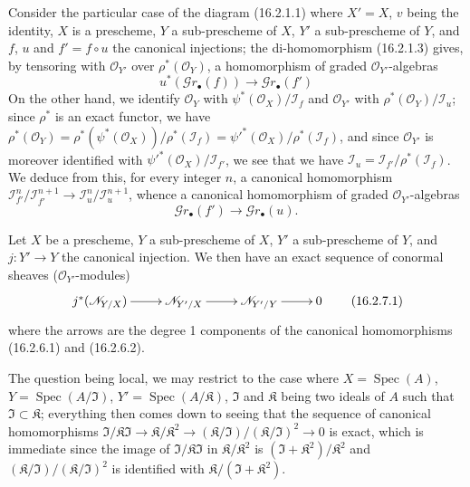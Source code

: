 \begin{env}[16.2.6]
\label{IV.16.2.6}
Consider the particular case of the diagram (16.2.1.1) where $X'=X$, $v$ being
the identity, $X$ is a prescheme, $Y$ a sub-prescheme of $X$, $Y'$ a
sub-prescheme of $Y$, and $f$, $u$ and $f'=f\circ u$ the canonical injections; the
di-homomorphism (16.2.1.3) gives, by tensoring with
$\mathcal{O}_{Y'}$ over $\rho^*(\mathcal{O}_Y)$, a homomorphism of
graded $\mathcal{O}_{Y'}$-algebras
\[
  u^*(\mathscr{G}r_\bullet(f))
  \longrightarrow\mathscr{G}r_\bullet(f')
  \tag{16.2.6.1}
  \label{IV.16.2.6.1}
\]
On the other hand, we identify $\mathcal{O}_Y$ with
$\psi^*(\mathcal{O}_X)/\mathscr{I}_f$ and $\mathcal{O}_{Y'}$ with
$\rho^*(\mathcal{O}_Y)/\mathscr{I}_u$; since $\rho^*$ is an exact functor,
we have
$\rho^*(\mathcal{O}_Y)=
\rho^*(\psi^*(\mathcal{O}_X))/\rho^*(\mathscr{I}_f)=
\psi'^*(\mathcal{O}_X)/\rho^*(\mathscr{I}_f)$, and since
$\mathcal{O}_{Y'}$ is moreover identified with
$\psi'^*(\mathcal{O}_X)/\mathscr{I}_{f'}$, we see that we have
$\mathscr{I}_u=\mathscr{I}_{f'}/\rho^*(\mathscr{I}_f)$. We deduce from this, for
every integer $n$, a canonical homomorphism
$\mathscr{I}_{f'}^n/\mathscr{I}_{f'}^{n+1}\to
\mathscr{I}_u^n/\mathscr{I}_u^{n+1}$, whence a canonical homomorphism of
graded $\mathcal{O}_{Y'}$-algebras
\[
  \mathscr{G}r_\bullet(f')
  \longrightarrow\mathscr{G}r_\bullet(u).
  \tag{16.2.6.2}
  \label{IV.16.2.6.2}
\]
\end{env}

\begin{proposition}[16.2.7]
\label{IV.16.2.7}
Let $X$ be a prescheme, $Y$ a sub-prescheme of $X$, $Y'$ a
sub-prescheme of $Y$, and $j:Y'\to Y$ the canonical injection. We then have an exact
sequence of conormal sheaves ($\mathcal{O}_{Y'}$-modules)
\[
  \xymatrix{
    j^*(\mathscr{N}_{Y/X}) \ar[r] &
    \mathscr{N}_{Y'/X} \ar[r] &
    \mathscr{N}_{Y'/Y} \ar[r] & 0
  }
  \tag{16.2.7.1}
  \label{IV.16.2.7.1}
\]
where the arrows are the degree 1 components of the canonical homomorphisms
(16.2.6.1) and (16.2.6.2).
\end{proposition}

The question being local, we may restrict to the case where
$X=\operatorname{Spec}(A)$, $Y=\operatorname{Spec}(A/\mathfrak{I})$,
$Y'=\operatorname{Spec}(A/\mathfrak{K})$, $\mathfrak{I}$ and $\mathfrak{K}$
being two ideals of $A$ such that $\mathfrak{I}\subset\mathfrak{K}$; everything
then comes down to seeing
that the sequence of canonical homomorphisms
$\mathfrak{I}/\mathfrak{K}\mathfrak{I}\to
\mathfrak{K}/\mathfrak{K}^2\to
(\mathfrak{K}/\mathfrak{I})/(\mathfrak{K}/\mathfrak{I})^2\to 0$
is exact, which is immediate since the image of
$\mathfrak{I}/\mathfrak{K}\mathfrak{I}$ in
$\mathfrak{K}/\mathfrak{K}^2$ is
$(\mathfrak{I}+\mathfrak{K}^2)/\mathfrak{K}^2$ and
$(\mathfrak{K}/\mathfrak{I})/(\mathfrak{K}/\mathfrak{I})^2$ is identified with
$\mathfrak{K}/(\mathfrak{I}+\mathfrak{K}^2)$.

